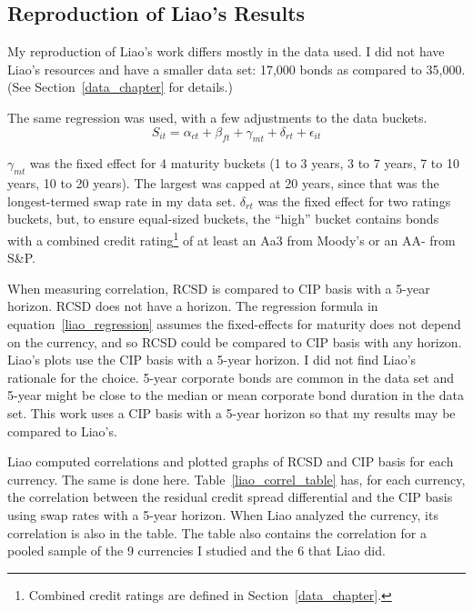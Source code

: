 

\subsection{Reproduction of Liao's Results}


My reproduction of Liao's work differs mostly in the data used.  I did not have Liao's resources and have a smaller data set: 17,000 bonds as compared to 35,000.  (See Section~\ref{data_chapter} for details.)

The same regression was used, with a few adjustments to the data buckets.  
\begin{equation}
  S_{it} = \alpha_{ct} + \beta_{ft} + \gamma_{mt} + \delta_{rt} + \epsilon_{it} 
\end{equation}

\noindent $\gamma_{mt}$ was the fixed effect for 4 maturity buckets (1 to 3 years, 3 to 7 years, 7 to 10 years, 10 to 20 years).  The largest was capped at 20 years, since that was the longest-termed swap rate in my data set.  $\delta_{rt}$ was the fixed effect for two ratings buckets, but, to ensure equal-sized buckets, the ``high'' bucket contains bonds with a combined credit rating\footnote{Combined credit ratings are defined in Section~\ref{data_chapter}.} of at least an Aa3 from Moody's or an AA- from S\&P.



When measuring correlation, RCSD is compared to CIP basis with a 5-year horizon.  RCSD does not have a horizon.  The regression formula in equation~\ref{liao_regression} assumes the fixed-effects for maturity does not depend on the currency, and so RCSD could be compared to CIP basis with any horizon.  Liao's plots use the CIP basis with a 5-year horizon.  I did not find Liao's rationale for the choice.  5-year corporate bonds are common in the data set and 5-year might be close to the median or mean corporate bond duration in the data set.  This work uses a CIP basis with a 5-year horizon so that my results may be compared to Liao's.  

Liao computed correlations and plotted graphs of RCSD and CIP basis for each currency.  The same is done here.  Table~\ref{liao_correl_table} has, for each currency, the correlation between the residual credit spread differential and the CIP basis using swap rates with a 5-year horizon.  When Liao analyzed the currency, its correlation is also in the table.  The table also contains the correlation for a pooled sample of the 9 currencies I studied and the 6 that Liao did.

